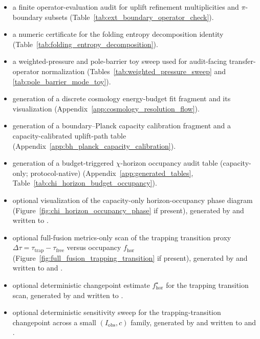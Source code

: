 \begin{itemize}
\item a finite operator-evaluation audit for uplift refinement multiplicities and $\pi$-boundary subsets (Table~\ref{tab:ext_boundary_operator_check}).
\item a numeric certificate for the folding entropy decomposition identity (Table~\ref{tab:folding_entropy_decomposition}).
\item a weighted-pressure and pole-barrier toy sweep used for audit-facing transfer-operator normalization (Tables~\ref{tab:weighted_pressure_sweep} and \ref{tab:pole_barrier_mode_toy}).
\item generation of a discrete cosmology energy-budget fit fragment and its visualization (Appendix~\ref{app:cosmology_resolution_flow}).
\item generation of a boundary--Planck capacity calibration fragment and a capacity-calibrated uplift-path table (Appendix~\ref{app:bh_planck_capacity_calibration}).
\item generation of a budget-triggered $\chi$-horizon occupancy audit table (capacity-only; protocol-native) (Appendix~\ref{app:generated_tables}, Table~\ref{tab:chi_horizon_budget_occupancy}).
\item \AuditTag optional visualization of the capacity-only horizon-occupancy phase diagram (Figure~\ref{fig:chi_horizon_occupancy_phase} if present), generated by  and written to .
\item \AuditTag optional full-fusion metrics-only scan of the trapping transition proxy $\Delta\tau=\tau_{\mathrm{trap}}-\tau_{\mathrm{free}}$ versus occupancy $f_{\mathrm{hor}}$ (Figure~\ref{fig:full_fusion_trapping_transition} if present), generated by  and written to  and .
\item \AuditTag optional deterministic changepoint estimate $f^\star_{\mathrm{hor}}$ for the trapping transition scan, generated by  and written to .
\item \AuditTag optional deterministic sensitivity sweep for the trapping-transition changepoint across a small $(I_{\mathrm{obs}},c)$ family, generated by  and written to  and .

\end{itemize}
